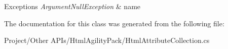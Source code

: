 \begin{DoxyExceptions}{Exceptions}
{\em Argument\+Null\+Exception} & name\\
\hline
\end{DoxyExceptions}


The documentation for this class was generated from the following file\+:\begin{DoxyCompactItemize}
\item 
Project/\+Other A\+P\+Is/\+Html\+Agility\+Pack/Html\+Attribute\+Collection.\+cs\end{DoxyCompactItemize}
